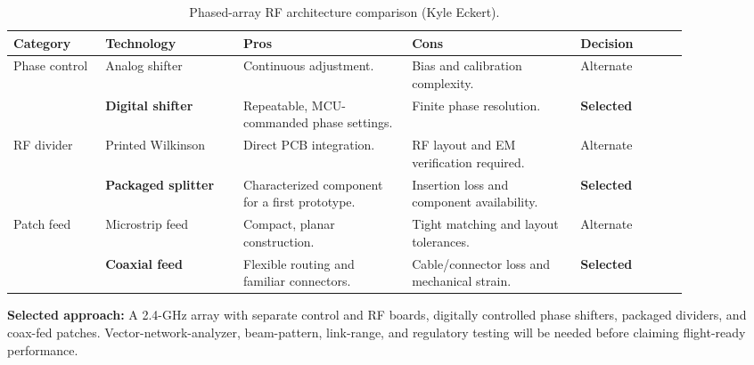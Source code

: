 \documentclass[11pt]{IEEEtran}
\begin{document}
\begin{table}[H]
\centering\small
\begin{tabular}{@{}p{0.125\linewidth}p{0.18\linewidth}p{0.22\linewidth}p{0.22\linewidth}p{0.14\linewidth}@{}}
\toprule
\textbf{Category} & \textbf{Technology} & \textbf{Pros} & \textbf{Cons} & \textbf{Decision} \\
\midrule
\multirow{2}{*}{Phase control}
 & Analog shifter & Continuous adjustment. & Bias and calibration complexity. & Alternate \\ \cmidrule{2-5}
 & \textbf{Digital shifter} & Repeatable, MCU-commanded phase settings. & Finite phase resolution. & \textbf{Selected} \\
\midrule
\multirow{2}{*}{RF divider}
 & Printed Wilkinson & Direct PCB integration. & RF layout and EM verification required. & Alternate \\ \cmidrule{2-5}
 & \textbf{Packaged splitter} & Characterized component for a first prototype. & Insertion loss and component availability. & \textbf{Selected} \\
\midrule
\multirow{2}{*}{Patch feed}
 & Microstrip feed & Compact, planar construction. & Tight matching and layout tolerances. & Alternate \\ \cmidrule{2-5}
 & \textbf{Coaxial feed} & Flexible routing and familiar connectors. & Cable/connector loss and mechanical strain. & \textbf{Selected} \\
\bottomrule
\end{tabular}
\vspace{3mm}
\caption{Phased-array RF architecture comparison (Kyle Eckert).}
\label{tab:RF_Comparison}
\end{table}

\noindent\textbf{Selected approach:} A 2.4-GHz array with separate control and RF boards, digitally controlled phase shifters, packaged dividers, and coax-fed patches. Vector-network-analyzer, beam-pattern, link-range, and regulatory testing will be needed before claiming flight-ready performance.
\end{document}
